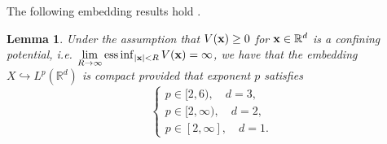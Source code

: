 \documentclass{elsarticle}
\newcommand{\be}{\begin{equation}}
\newcommand{\ee}{\end{equation}}
\newtheorem{lemma}{Lemma}[section]
\newcommand{\bx}{{\bf x} }
\DeclareMathOperator*{\essinf}{ess\,inf}
\renewcommand{\ldots}{\dotsc}
\begin{document}
The following embedding results hold \cite{Bao2013}.
\begin{lemma}\label{lem:compact} Under the assumption that $V(\bx)\ge0$
for $\bx\in {\mathbb R}^d$ is a confining potential,
i.e. $\lim\limits_{R\to\infty}\essinf_{|\bx|<R} V(\bx)=\infty$,
we have that
the embedding $X\hookrightarrow L^{p}(\mathbb R^d)$
is compact provided that exponent $p$
 satisfies
\begin{equation}
\begin{cases}
p\in[2,6),\quad d=3,\\
p\in[2,\infty),\quad d=2,\\
p\in [2,\infty],\quad d=1.
\end{cases}
\end{equation}
\end{lemma}
\end{document}
